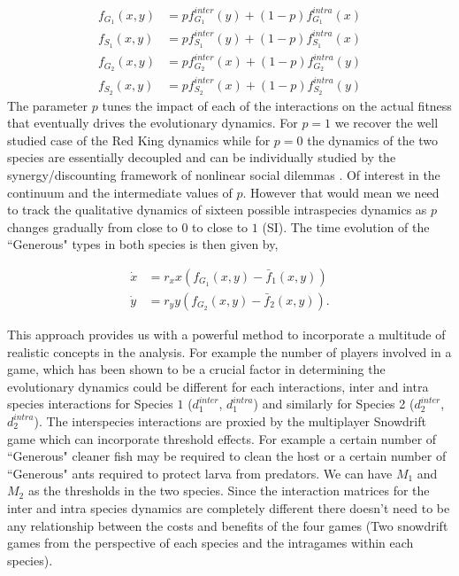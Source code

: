 \documentclass{pnastwo}
\begin{document}
\begin{article}
%
\begin{align}
	f_{G_1} (x,y) &= p f^{inter}_{G_1} (y) + (1-p) f^{intra}_{G_1} (x) \nonumber \\
	f_{S_1} (x,y) &= p f^{inter}_{S_1} (y) + (1-p) f^{intra}_{S_1} (x) \nonumber \\
	f_{G_2} (x,y) &= p f^{inter}_{G_2} (x) + (1-p) f^{intra}_{G_2} (y) \\
	f_{S_2} (x,y) &= p f^{inter}_{S_2} (x) + (1-p) f^{intra}_{S_2} (y) \nonumber
\end{align}
%
The parameter $p$ tunes the impact of each of the interactions on the actual fitness that eventually drives the evolutionary dynamics.
For $p=1$ we recover the well studied case of the Red King dynamics \cite{gokhale:PRSB:2012} while for $p=0$ the dynamics of the two species are essentially decoupled and can be individually studied by the synergy/discounting framework of nonlinear social dilemmas \cite{hauert:JTB:2006a}.
Of interest in the continuum and the intermediate values of $p$.
However that would mean we need to track the qualitative dynamics of sixteen possible intraspecies dynamics as $p$ changes gradually from close to $0$ to close to $1$ (SI). 
The time evolution of the ``Generous" types in both species is then given by,

\begin{align}
\dot{x} &= r_x x \left(f_{G_1}(x,y) -  \bar{f}_1(x,y) \right) \nonumber \\
\dot{y} &= r_y y \left(f_{G_2}(x,y) -  \bar{f}_2(x,y) \right).
\label{eq:repeqs}
\end{align}


This approach provides us with a powerful method to incorporate a multitude of realistic concepts in the analysis.
For example the number of players involved in a game, which has been shown to be a crucial factor in determining the evolutionary dynamics could be different for each interactions, inter and intra species interactions for Species $1$ ($d^{inter}_1$, $d^{intra}_1$) and similarly for Species 2 ($d^{inter}_2$, $d^{intra}_2$). 
The interspecies interactions are proxied by the multiplayer Snowdrift game which can incorporate threshold effects.
For example a certain number of ``Generous" cleaner fish may be required to clean the host or a certain number of ``Generous" ants required to protect larva from predators.
We can have $M_1$ and $M_2$ as the thresholds in the two species.
Since the interaction matrices for the inter and intra species dynamics are completely different there doesn't need to be any relationship between the costs and benefits of the four games (Two snowdrift games from the perspective of each species and the intragames within each species).


\end{article}
\end{document}
